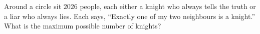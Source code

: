 Around a circle sit $2026$ people, each either a knight who always tells the truth or a liar who always lies. Each says, ``Exactly one of my two neighbours is a knight.'' What is the maximum possible number of knights?
